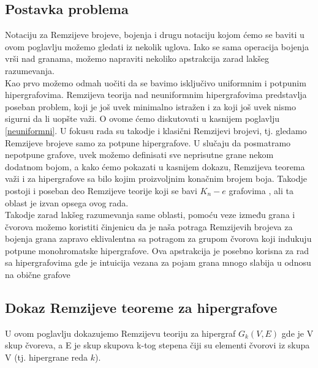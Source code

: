 \documentclass[a4paper]{article}
\begin{document}
	\subsection{Postavka problema}\label{psotavka}
	Notaciju za Remzijeve brojeve, bojenja i drugu notaciju kojom ćemo se baviti u ovom poglavlju možemo gledati iz nekolik uglova. Iako se sama operacija bojenja vrši nad granama, možemo napraviti nekoliko apstrakcija zarad lakšeg razumevanja.\\
	Kao prvo možemo odmah uočiti da se bavimo isključivo uniformnim i potpunim hipergrafovima. Remzijeva teorija nad neuniformnim hipergrafovima predstavlja poseban problem, koji je još uvek minimalno istražen i za koji još uvek nismo sigurni da li uopšte važi. O ovome ćemo diskutovati u kasnijem poglavlju \ref{neuniformni}. U fokusu rada su takodje i klasični Remzijevi brojevi, tj. gledamo Remzijeve brojeve samo za potpune hipergrafove. U slučaju da posmatramo nepotpune grafove, uvek možemo definisati sve neprisutne grane nekom dodatnom bojom, a kako ćemo pokazati u kasnijem dokazu, Remzijeva teorema važi i za hipergrafove sa bilo kojim proizvoljnim konačnim brojem boja. Takodje postoji i poseban deo Remzijeve teorije koji se bavi $K_n - e$ grafovima \cite{pregled}, ali ta oblast je izvan opsega ovog rada.\\
	Takodje zarad lakšeg razumevanja same oblasti, pomoću veze između grana i čvorova možemo koristiti činjenicu da je naša potraga Remzijevih brojeva za bojenja grana zapravo eklivalentna sa potragom za grupom čvorova koji indukuju potpune monohromatske hipergrafove. Ova apstrakcija je posebno korisna za rad sa hipergrafovima gde je intuicija vezana za pojam grana mnogo slabija u odnosu na obične grafove
	\subsection{Dokaz Remzijeve teoreme za hipergrafove}
	U ovom poglavlju dokazujemo Remzijevu teoriju %
	za hipergraf $ G_{k}(V, E)$ gde je V skup čvoreva, a E je skup skupova k-tog stepena čiji su elementi čvorovi iz skupa V (tj. hipergrane reda $k$).
	
\end{document}
